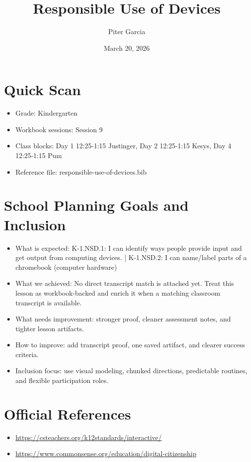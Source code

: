 \documentclass[11pt]{article}
\title{Responsible Use of Devices}
\author{Piter Garcia}
\date{March 20, 2026}
\begin{document}
    \maketitle
    \section*{Quick Scan}
    \begin{itemize}[leftmargin=*]
    \item Grade: Kindergarten
    \item Workbook sessions: Session 9
    \item Class blocks: Day 1 12:25-1:15 Justinger, Day 2 12:25-1:15 Kesys, Day 4 12:25-1:15 Pum
    \item Reference file: responsible-use-of-devices.bib
    \end{itemize}
    \section*{School Planning Goals and Inclusion}
    \begin{itemize}[leftmargin=*]
    \item What is expected: K-1.NSD.1: I can identify ways people provide input and get output from computing devices. | K-1.NSD.2: I can name/label parts of a chromebook (computer hardware)
    \item What we achieved: No direct transcript match is attached yet. Treat this lesson as workbook-backed and enrich it when a matching classroom transcript is available.
    \item What needs improvement: stronger proof, cleaner assessment notes, and tighter lesson artifacts.
    \item How to improve: add transcript proof, one saved artifact, and clearer success criteria.
    \item Inclusion focus: use visual modeling, chunked directions, predictable routines, and flexible participation roles.
    \end{itemize}
    \section*{Official References}
    \begin{itemize}[leftmargin=*]
    \item \url{https://csteachers.org/k12standards/interactive/}
\item \url{https://www.commonsense.org/education/digital-citizenship}

    \end{itemize}
    
\end{document}
